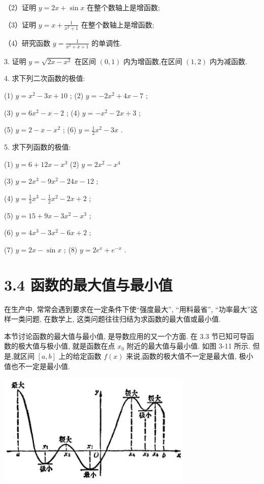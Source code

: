 \documentclass[10pt]{article}
\begin{document}
（2）证明 \(y = {2x} + \sin x\) 在整个数轴上是增函数;

（3）证明 \(y = x + \frac{1}{{x}^{2} + 1}\) 在整个数轴上是增函数;

（4）研究函数 \(y = \frac{1}{{x}^{2} + x + 1}\) 的单调性.

3. 证明 \(y = \sqrt{{2x} - {x}^{2}}\) 在区间 \(\left( {0,1}\right)\) 内为增函数,在区间 \(\left( {1,2}\right)\) 内为减函数.

4. 求下列二次函数的极值:

(1) \(y = {x}^{2} - {3x} + {10}\) ; (2) \(y = - 2{x}^{2} + {4x} - 7\) ;

(3) \(y = 6{x}^{2} - x - 2\) ; (4) \(y = - {x}^{2} - {2x} + 3\) ;

(5) \(y = 2 - x - {x}^{2}\) ; (6) \(y = \frac{1}{2}{x}^{2} - {3x}\) .

5. 求下列函数的极值:

(1) \(y = 6 + {12x} - {x}^{3}\) (2) \(y = 2{x}^{2} - {x}^{4}\)

(3) \(y = 2{x}^{3} - 9{x}^{2} - {24x} - {12}\) ;

(4) \(y = \frac{1}{3}{x}^{3} - \frac{1}{2}{x}^{2} - {2x} + 2\) ;

(5) \(y = {15} + {9x} - 3{x}^{2} - {x}^{3}\) ;

(6) \(y = 4{x}^{3} - 3{x}^{2} - {6x} + 2\) ;

(7) \(y = {2x} - \sin x\) ; (8) \(y = 2{e}^{x} + {e}^{-x}\) .

\section*{3.4 函数的最大值与最小值}

在生产中, 常常会遇到要求在一定条件下使“强度最大”, “用料最省”, “功率最大”这样一类问题, 在数学上, 这类问题往往归结为求函数的最大值或最小值.

本节讨论函数的最大值与最小值, 是导数应用的又一个方面. 在 3.3 节已知可导函数的极大值与极小值, 就是函数在点 \({x}_{0}\) 附近的最大值与最小值. 如图 3-11 所示. 但是,就区间 \(\left\lbrack {a,b}\right\rbrack\) 上的给定函数 \(f\left( x\right)\) 来说,函数的极大值不一定是最大值, 极小值也不一定是最小值.

\begin{center}
\includegraphics[max width=0.7\textwidth]{images/01912c18-5c3f-733d-b775-749ba9897a9d_146_522148.jpg}
\end{center}
\end{document}
